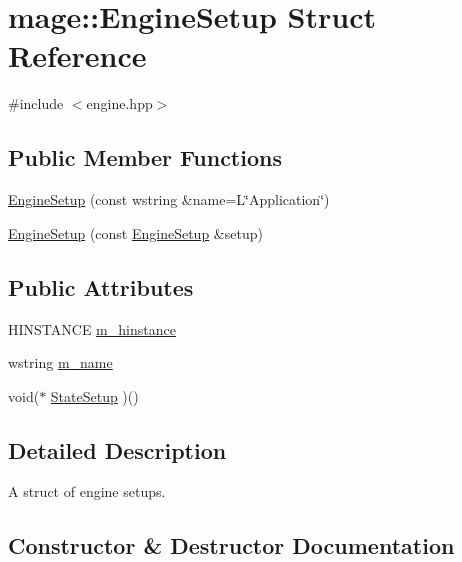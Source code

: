 \hypertarget{structmage_1_1_engine_setup}{}\section{mage\+:\+:Engine\+Setup Struct Reference}
\label{structmage_1_1_engine_setup}


{\ttfamily \#include $<$engine.\+hpp$>$}

\subsection*{Public Member Functions}
\begin{DoxyCompactItemize}
\item 
\hyperlink{structmage_1_1_engine_setup_a75ee36366d3035c9600e1dbe98973aa4}{Engine\+Setup} (const wstring \&name=L\char`\"{}Application\char`\"{})
\item 
\hyperlink{structmage_1_1_engine_setup_a2399c7966ed02ce9e9ab951b7483aac1}{Engine\+Setup} (const \hyperlink{structmage_1_1_engine_setup}{Engine\+Setup} \&setup)
\end{DoxyCompactItemize}
\subsection*{Public Attributes}
\begin{DoxyCompactItemize}
\item 
H\+I\+N\+S\+T\+A\+N\+CE \hyperlink{structmage_1_1_engine_setup_af91461305cd9aa60e22fa770395d2238}{m\+\_\+hinstance}
\item 
wstring \hyperlink{structmage_1_1_engine_setup_a3866920e44c0752a89265f9f0c5c5d05}{m\+\_\+name}
\item 
void($\ast$ \hyperlink{structmage_1_1_engine_setup_a36a3c8a316c63e6c90ee9dd6efb82c0c}{State\+Setup} )()
\end{DoxyCompactItemize}


\subsection{Detailed Description}
A struct of engine setups. 

\subsection{Constructor \& Destructor Documentation}
\hypertarget{structmage_1_1_engine_setup_a75ee36366d3035c9600e1dbe98973aa4}{}\label{structmage_1_1_engine_setup_a75ee36366d3035c9600e1dbe98973aa4} 
